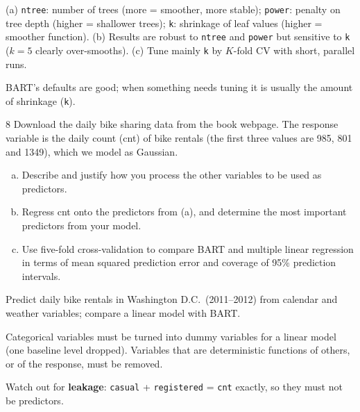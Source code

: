 \documentclass[11pt]{article}
\begin{document}
\begin{answer}
(a) \texttt{ntree}: number of trees (more = smoother, more stable); \texttt{power}: penalty on tree depth (higher = shallower trees); \texttt{k}: shrinkage of leaf values (higher = smoother function). (b) Results are robust to \texttt{ntree} and \texttt{power} but sensitive to \texttt{k} ($k=5$ clearly over-smooths). (c) Tune mainly \texttt{k} by $K$-fold CV with short, parallel runs.
\end{answer}

\begin{takeaway}
BART's defaults are good; when something needs tuning it is usually the amount of shrinkage (\texttt{k}).
\end{takeaway}


\begin{problem}{8}
Download the daily bike sharing data from the book webpage. The response variable is the daily count (cnt) of bike rentals (the first three values are 985, 801 and 1349), which we model as Gaussian.
\begin{enumerate}[(a)]
\item Describe and justify how you process the other variables to be used as predictors.
\item Regress cnt onto the predictors from (a), and determine the most important predictors from your model.
\item Use five-fold cross-validation to compare BART and multiple linear regression in terms of mean squared prediction error and coverage of 95\% prediction intervals.
\end{enumerate}
\end{problem}

\begin{restate}
Predict daily bike rentals in Washington D.C.\ (2011--2012) from calendar and weather variables; compare a linear model with BART.
\end{restate}

\begin{recall}
Categorical variables must be turned into dummy variables for a linear model (one baseline level dropped). Variables that are deterministic functions of others, or of the response, must be removed.
\end{recall}

\begin{keyidea}
Watch out for \textbf{leakage}: \texttt{casual} + \texttt{registered} = \texttt{cnt} exactly, so they must not be predictors.
\end{keyidea}
\end{document}
